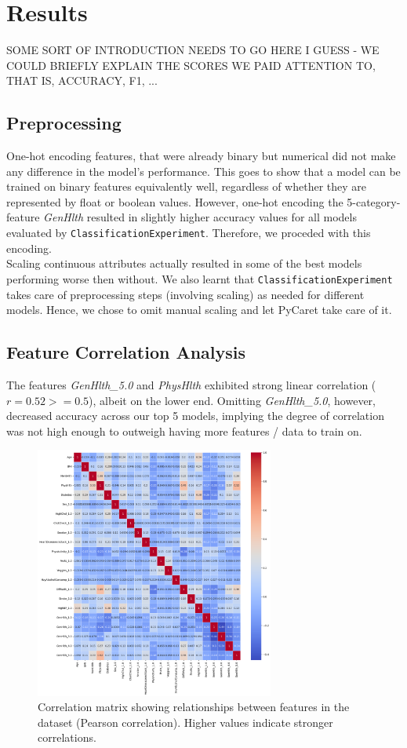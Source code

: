 \documentclass[a4paper,12pt]{article}
\begin{document}
\section{Results}
SOME SORT OF INTRODUCTION NEEDS TO GO HERE I GUESS - WE COULD BRIEFLY EXPLAIN THE SCORES WE PAID ATTENTION TO,
THAT IS, ACCURACY, F1, ...

\subsection{Preprocessing}
One-hot encoding features, that were already binary but numerical did not make any difference in the model's
performance. This goes to show that a model can be trained on binary features equivalently well, regardless
of whether they are represented by float or boolean values. However, one-hot encoding the 5-category-feature
\textit{GenHlth} resulted in slightly higher accuracy values for all models evaluated by \texttt{ClassificationExperiment}.
Therefore, we proceded with this encoding.
\\
Scaling continuous attributes actually resulted in some of the best models performing worse then without.
We also learnt that \texttt{ClassificationExperiment} takes care of preprocessing steps (involving scaling)
as needed for different models. Hence, we chose to omit manual scaling and let PyCaret take care of it.

\subsection{Feature Correlation Analysis}
The features \textit{GenHlth\_5.0} and \textit{PhysHlth} exhibited strong linear correlation ($r = 0.52 >= 0.5$),
albeit on the lower end. Omitting \textit{GenHlth\_5.0}, however, decreased accuracy across our top 5 models,
implying the degree of correlation was not high enough to outweigh having more features / data to train 
on.

\begin{figure}[H]
    \centering
    \includegraphics[width=0.7\textwidth]{correlation_matrix.png}
    \caption{Correlation matrix showing relationships between features in the dataset (Pearson correlation). 
    Higher values indicate stronger correlations.}
    \label{fig:correlation_matrix}
\end{figure}
\end{document}
